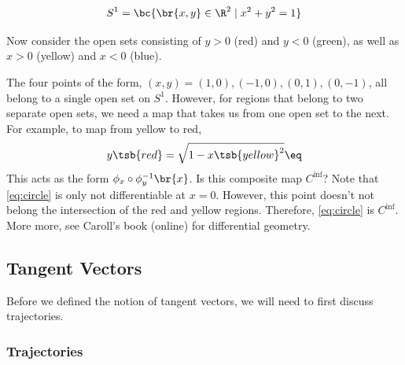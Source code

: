 \documentclass{article}
\begin{document}
\[ S^1 = \bc{\br{x,y}\in \R^2 \mid x^2 + y^2 = 1} \]

Now consider the open sets consisting of $y>0$ (red) and $y<0$ (green), as well as $x>0$ (yellow) and $x<0$ (blue).

\begin{center}
\end{center}

The four points of the form, $(x,y) = (1,0),(-1,0),(0,1),(0,-1)$, all belong to a single open set on $S^1$. However, for regions that belong to two separate open sets, we need a map that takes us from one open set to the next. For example, to map from yellow to red,
\[ y\tsb{red} = \sqrt{1 - x\tsb{yellow}^2} \eq \label{eq:circle}\]
This acts as the form $\phi_x \circ \phi_y^{-1} \br{x}$. Is this composite map $C^{\inf}$? Note that \eqref{eq:circle} is only not differentiable at $x = 0$. However, this point doesn't not belong the intersection of the red and yellow regions. Therefore, \eqref{eq:circle} is $C^\inf$. More more, see Caroll's book (online) for differential geometry.

\subsection{Tangent Vectors}

Before we defined the notion of tangent vectors, we will need to first discuss trajectories.

\subsubsection{Trajectories}

\newcommand{\CC}{\mathcal{C}}
\end{document}

